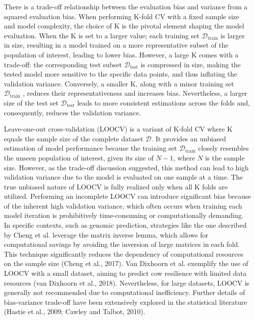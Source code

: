 There is a trade-off relationship between the evaluation bias and variance from a squared evaluation bias. When performing K-fold CV with a fixed sample size and model complexity, the choice of K is the pivotal element shaping the model evaluation. When the K is set to a larger value; each training set $\mathcal{D}_\text{train}$ is larger in size, resulting in a model trained on a more representative subset of the population of interest, leading to lower bias. However, a large K comes with a trade-off: the corresponding test subset $\mathcal{D}_\text{test}$ is compressed in size, making the tested model more sensitive to the specific data points, and thus inflating the validation variance. Conversely, a smaller K, along with a minor training set $\mathcal{D}_\text{train}$ , reduces their representativeness and increases bias. Nevertheless, a larger size of the test set $\mathcal{D}_\text{test}$ leads to more consistent estimations across the folds and, consequently, reduces the validation variance.

Leave-one-out cross-validation (LOOCV) is a variant of K-fold CV where K equals the sample size of the complete dataset $\mathcal{D}$. It provides an unbiased estimation of model performance because the training set $\mathcal{D}_\text{train}$ closely resembles the unseen population of interest, given its size of $N - 1$, where $N$ is the sample size. However, as the trade-off discussion suggested, this method can lead to high validation variance due to the model is evaluated on one sample at a time. The true unbiased nature of LOOCV is fully realized only when all K folds are utilized. Performing an incomplete LOOCV can introduce significant bias because of the inherent high validation variance, which often occurs when training each model iteration is prohibitively time-consuming or computationally demanding. In specific contexts, such as genomic prediction, strategies like the one described by Cheng et al. leverage the matrix inverse lemma, which allows for computational savings by avoiding the inversion of large matrices in each fold. This technique significantly reduces the dependency of computational resources on the sample size (Cheng et al., 2017). Van Dixhoorn et al. exemplify the use of LOOCV with a small dataset, aiming to predict cow resilience with limited data resources (van Dixhoorn et al., 2018). Nevertheless, for large datasets, LOOCV is generally not recommended due to computational inefficiency. Further details of bias-variance trade-off have been extensively explored in the statistical literature (Hastie et al., 2009; Cawley and Talbot, 2010).

